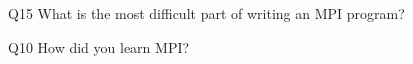 \begin{description}%
\item{Q15} What is the most difficult part of writing an MPI program?%
\item{Q10} How did you learn MPI?%
\end{description}%
